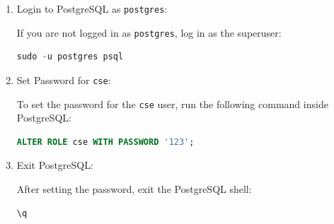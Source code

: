 \documentclass[12pt,a4paper]{article}
\begin{document}
\begin{enumerate}
\item Login to PostgreSQL as \texttt{postgres}:

   If you are not logged in as \texttt{postgres}, log in as the superuser:

   \begin{lstlisting}[language=SQL]
   sudo -u postgres psql
   \end{lstlisting}

\item Set Password for \texttt{cse}:

   To set the password for the \texttt{cse} user, run the following command inside PostgreSQL:

   \begin{lstlisting}[language=SQL]
   ALTER ROLE cse WITH PASSWORD '123';
   \end{lstlisting}

\item Exit PostgreSQL:

   After setting the password, exit the PostgreSQL shell:

   \begin{lstlisting}[language=SQL]
   \q
   \end{lstlisting}
   
\end{enumerate}
\end{document}
